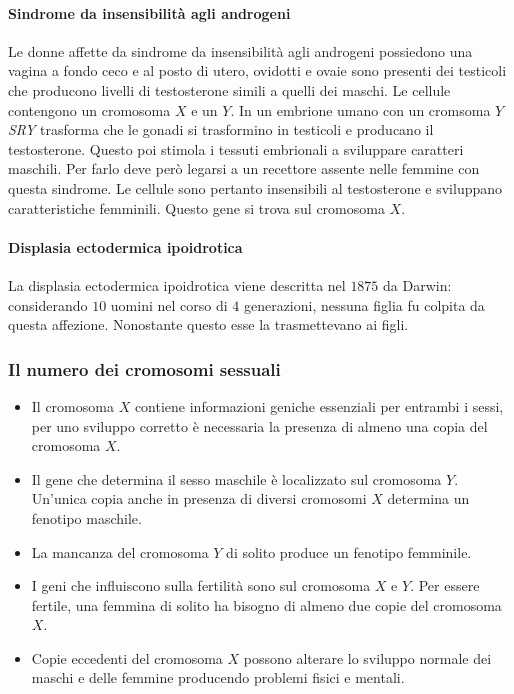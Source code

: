 			\paragraph{Sindrome da insensibilit\`a agli androgeni}
			Le donne affette da sindrome da insensibilit\`a agli androgeni possiedono una vagina a fondo ceco e al posto di utero, ovidotti e ovaie sono presenti dei testicoli che producono livelli di testosterone simili a quelli dei maschi.
			Le cellule contengono un cromosoma $X$ e un $Y$.
			In un embrione umano con un cromsoma $Y$ \emph{SRY} trasforma che le gonadi si trasformino in testicoli e producano il testosterone.
			Questo poi stimola i tessuti embrionali a sviluppare caratteri maschili.
			Per farlo deve per\`o legarsi a un recettore assente nelle femmine con questa sindrome.
			Le cellule sono pertanto insensibili al testosterone e sviluppano caratteristiche femminili.
			Questo gene si trova sul cromosoma $X$.

			\paragraph{Displasia ectodermica ipoidrotica}
			La displasia ectodermica ipoidrotica viene descritta nel $1875$ da Darwin: considerando $10$ uomini nel corso di $4$ generazioni, nessuna figlia fu colpita da questa affezione.
			Nonostante questo esse la trasmettevano ai figli.
	

		\subsubsection{Il numero dei cromosomi sessuali}
		\begin{multicols}{2}
			\begin{itemize}
				\item Il cromosoma $X$ contiene informazioni geniche essenziali per entrambi i sessi, per uno sviluppo corretto \`e necessaria la presenza di almeno una copia del cromosoma $X$.
				\item Il gene che determina il sesso maschile \`e localizzato sul cromosoma $Y$.
					Un'unica copia anche in presenza di diversi cromosomi $X$ determina un fenotipo maschile.
				\item La mancanza del cromosoma $Y$ di solito produce un fenotipo femminile.
				\item I geni che influiscono sulla fertilit\`a sono sul cromosoma $X$ e $Y$.
					Per essere fertile, una femmina di solito ha bisogno di almeno due copie del cromosoma $X$.
				\item Copie eccedenti del cromosoma $X$ possono alterare lo sviluppo normale dei maschi e delle femmine producendo problemi fisici e mentali.
			\end{itemize}
		\end{multicols}
	
